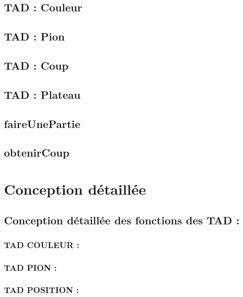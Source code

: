 \documentclass{article}
\begin{document}
\subsection{TAD : Couleur}


\subsection{TAD : Pion}


\subsection{TAD : Coup}


\subsection{TAD : Plateau}


\subsection{faireUnePartie}


\subsection{obtenirCoup}




\section{Conception détaillée}
\subsection{Conception détaillée des fonctions des TAD :}

\subsubsection{TAD COULEUR :}


\subsubsection{TAD PION :}


\subsubsection{TAD POSITION :}

\end{document}
